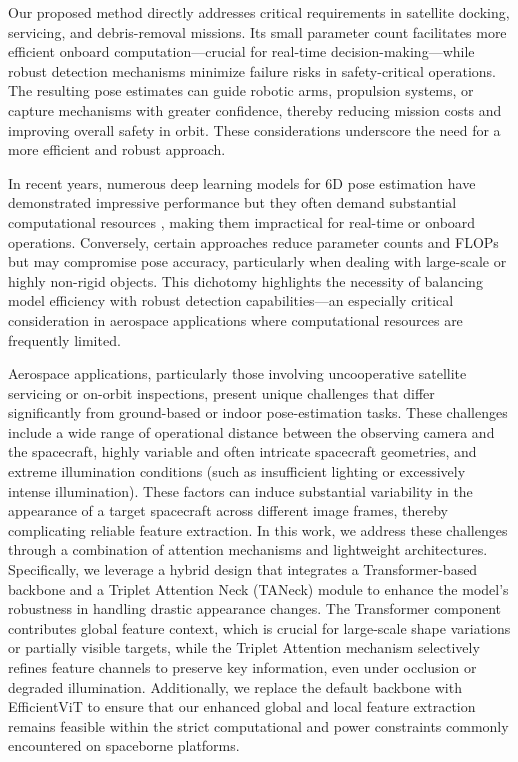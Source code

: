 \documentclass[a4paper,fleqn]{cas-sc}
\begin{document}
Our proposed method directly addresses critical requirements in satellite docking, servicing, and debris-removal missions. Its small parameter count facilitates more efficient onboard computation—crucial for real-time decision-making—while robust detection mechanisms minimize failure risks in safety-critical operations. The resulting pose estimates can guide robotic arms, propulsion systems, or capture mechanisms with greater confidence, thereby reducing mission costs and improving overall safety in orbit. These considerations underscore the need for a more efficient and robust approach.

In recent years, numerous deep learning models for 6D pose estimation have demonstrated impressive performance but they often demand substantial computational resources \citep{Pavlakos_2017_ICRA,He_2020_CVPR, peng2019pvnet}, making them impractical for real-time or onboard operations. Conversely, certain approaches reduce parameter counts and FLOPs \citep{Zhao_2020_CVPR} but may compromise pose accuracy, particularly when dealing with large-scale or highly non-rigid objects. This dichotomy highlights the necessity of balancing model efficiency with robust detection capabilities—an especially critical consideration in aerospace applications where computational resources are frequently limited.

Aerospace applications, particularly those involving uncooperative satellite servicing or on-orbit inspections, present unique challenges that differ significantly from ground-based or indoor pose-estimation tasks. These challenges include a wide range of operational distance between the observing camera and the spacecraft, highly variable and often intricate spacecraft geometries, and extreme illumination conditions (such as insufficient lighting or excessively intense illumination). These factors can induce substantial variability in the appearance of a target spacecraft across different image frames, thereby complicating reliable feature extraction. In this work, we address these challenges through a combination of attention mechanisms and lightweight architectures. Specifically, we leverage a hybrid design that integrates a Transformer-based backbone and a Triplet Attention Neck (TANeck) module to enhance the model's robustness in handling drastic appearance changes. The Transformer component contributes global feature context, which is crucial for large-scale shape variations or partially visible targets, while the Triplet Attention mechanism selectively refines feature channels to preserve key information, even under occlusion or degraded illumination. Additionally, we replace the default backbone with EfficientViT to ensure that our enhanced global and local feature extraction remains feasible within the strict computational and power constraints commonly encountered on spaceborne platforms.
\end{document}
